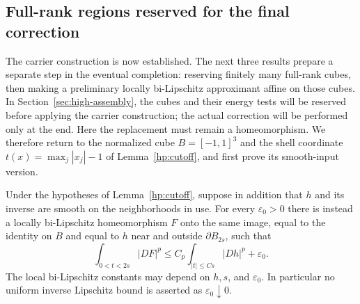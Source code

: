 \subsection{Full-rank regions reserved for the final correction}

The carrier construction is now established.  The next three results
prepare a separate step in the eventual completion: reserving finitely many full-rank cubes, then making a
preliminary locally bi-Lipschitz approximant affine on those cubes.
In Section~\ref{sec:high-assembly}, the cubes and their energy tests
will be reserved before applying the carrier construction; the actual
correction will be performed only at the end.  Here the replacement must remain a homeomorphism.  We therefore return
to the normalized cube $B=[-1,1]^3$ and the shell coordinate
$t(x)=\max_j|x_j|-1$ of Lemma~\ref{hp:cutoff}, and first prove its
smooth-input version.

\begin{lemma}\label{hp:smooth-cutoff}
Under the hypotheses of Lemma~\ref{hp:cutoff}, suppose in addition
that $h$ and its inverse are smooth on the neighborhoods in use.
For every $\varepsilon_0>0$ there is instead a locally bi-Lipschitz
homeomorphism $F$ onto the same image, equal to the identity on $B$
and equal to $h$ near and outside $\partial B_{2s}$, such that
\begin{equation}\label{hp:smooth-cutoff-energy}
 \int_{0<t<2s}|DF|^p
 \leq C_p\int_{|t|\leq Cs}|Dh|^p+\varepsilon_0.
\end{equation}
The local bi-Lipschitz constants may depend on $h,s$, and
$\varepsilon_0$.  In particular no uniform inverse Lipschitz bound
is asserted as $\varepsilon_0\downarrow0$.
\end{lemma}

